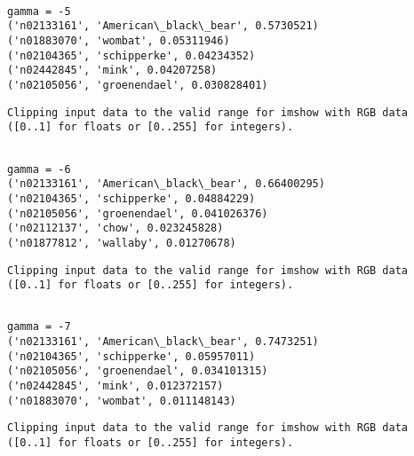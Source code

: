 \documentclass[11pt]{article}
\begin{document}
    \begin{Verbatim}[commandchars=\\\{\}]

gamma = -5
('n02133161', 'American\_black\_bear', 0.5730521)
('n01883070', 'wombat', 0.05311946)
('n02104365', 'schipperke', 0.04234352)
('n02442845', 'mink', 0.04207258)
('n02105056', 'groenendael', 0.030828401)

    \end{Verbatim}

    \begin{Verbatim}[commandchars=\\\{\}]
Clipping input data to the valid range for imshow with RGB data ([0..1] for floats or [0..255] for integers).

    \end{Verbatim}

    \begin{Verbatim}[commandchars=\\\{\}]

gamma = -6
('n02133161', 'American\_black\_bear', 0.66400295)
('n02104365', 'schipperke', 0.04884229)
('n02105056', 'groenendael', 0.041026376)
('n02112137', 'chow', 0.023245828)
('n01877812', 'wallaby', 0.01270678)

    \end{Verbatim}

    \begin{Verbatim}[commandchars=\\\{\}]
Clipping input data to the valid range for imshow with RGB data ([0..1] for floats or [0..255] for integers).

    \end{Verbatim}

    \begin{Verbatim}[commandchars=\\\{\}]

gamma = -7
('n02133161', 'American\_black\_bear', 0.7473251)
('n02104365', 'schipperke', 0.05957011)
('n02105056', 'groenendael', 0.034101315)
('n02442845', 'mink', 0.012372157)
('n01883070', 'wombat', 0.011148143)

    \end{Verbatim}

    \begin{Verbatim}[commandchars=\\\{\}]
Clipping input data to the valid range for imshow with RGB data ([0..1] for floats or [0..255] for integers).

    \end{Verbatim}
\end{document}
